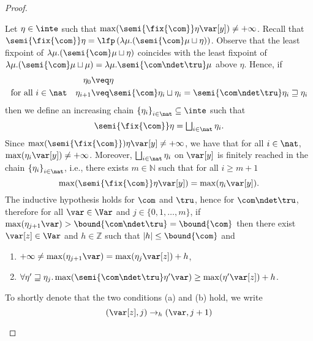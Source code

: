 \begin{proof}
\begin{inductive}
    \case{\(\fix{\com}\)}
    Let \(\eta \in \inte\) such that
    \(\max(\semi{\fix{\com}} \eta \var[y]) \neq + \infty\). Recall that
    \(\semi{\fix{\com}} \eta = \lfp\left({\lambda \mu. (\semi{\com} \mu
        \sqcup\eta)}\right)\). Observe that the least fixpoint of
    \(\lambda \mu. (\semi{\com} \mu \sqcup\eta)\) coincides with the
    least fixpoint of
    \(\lambda \mu. (\semi{\com} \mu \sqcup \mu) = \lambda \mu. \semi{
      \com\ndet \tru} \mu\) above \(\eta\). Hence, if
    \begin{align*}
    \eta_0 & \veq \eta \\
    \text{for all } i\in \nat \quad \eta_{i+1} & \veq \semi{\com} \eta_i \sqcup \eta_i= \semi{\com \ndet \tru} \eta_i \sqsupseteq \eta_i
    \end{align*}
    then we define an increasing chain
    \({\{\eta_i\}}_{i\in \nat}\subseteq \inte\) such that
    \[ 
      \semi{\fix{\com}} \eta = \textstyle\bigsqcup_{i \in \nat} \eta_i.
    \]
    Since \(\max(\semi{\fix{\com}}) \eta \var[y] \neq +\infty\), we have
    that for all \(i\in \nat\), \(\max(\eta_i \var[y]) \neq
    +\infty\). Moreover, \(\textstyle\bigsqcup_{i \in \nat} \eta_i\) on
    \(\var[y]\) is finitely reached in the chain
    \({\{\eta_i\}}_{i\in \nat}\), i.e., there exists
    \(m \in \mathbb{N}\) such that for all \(i \geq m+1\)
    \[
      \max(\semi{\fix{\com}} \eta \var[y]) = \max(\eta_{i} \var[y]).
    \]
    The inductive hypothesis holds for \(\com\) and \(\tru\), hence for
    \(\com \ndet \tru\), therefore for all \(\var \in \Var\) and
    \(j \in \{0,1, \ldots, m\}\), if \(\max(\eta_{j+1} \var) >\bound{\com\ndet \tru} =\bound{\com}\) then
    there exist \(\var[z] \in \Var\) and \(h \in \mathbb{Z}\) such that \(|h| \leq \bound{\com}\) and 
    \begin{enumerate}[label=(\alph*)]
    \item\label{pointa} \(+\infty \neq \max(\eta_{j+1} \var) = \max(\eta_j \var[z]) + h\),
    \item\label{pointb} \(\forall \eta' \sqsupseteq \eta_j.
      \max(\semi{\com \ndet \tru}\eta'\var) \geq \max(\eta' \var[z]) + h\).
    \end{enumerate}
    To shortly denote that the two conditions (a) and (b) hold, we write
    \[
      (\var[z],j) \to_{h} (\var, j+1)
    \]
    

\end{inductive}
\end{proof}
